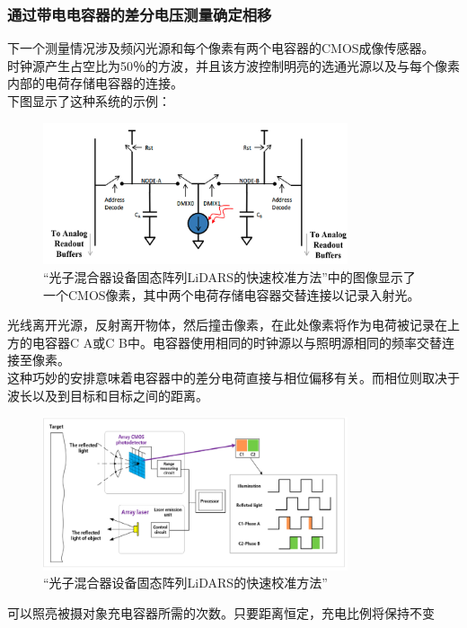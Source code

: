 \documentclass[UTF8]{ctexart}
\begin{document}
\subsubsection{通过带电电容器的差分电压测量确定相移}
下一个测量情况涉及频闪光源和每个像素有两个电容器的CMOS成像传感器。\\
时钟源产生占空比为50％的方波，并且该方波控制明亮的选通光源以及与每个像素内部的电荷存储电容器的连接。\\
下图显示了这种系统的示例：
\begin{figure}
	\centering
	\includegraphics[width=0.8\textwidth]{电路.png}
	\caption{“光子混合器设备固态阵列LiDARS的快速校准方法”中的图像显示了一个CMOS像素，其中两个电荷存储电容器交替连接以记录入射光。}
\end{figure}
光线离开光源，反射离开物体，然后撞击像素，在此处像素将作为电荷被记录在上方的电容器C A或C B中。电容器使用相同的时钟源以与照明源相同的频率交替连接至像素。  \\
这种巧妙的安排意味着电容器中的差分电荷直接与相位偏移有关。而相位则取决于波长以及到目标和目标之间的距离。\\
\begin{figure}
	\centering
	\includegraphics[width=0.8\textwidth]{快速校准方法.png}
	\caption{“光子混合器设备固态阵列LiDARS的快速校准方法”}
\end{figure}
可以照亮被摄对象充电容器所需的次数。只要距离恒定，充电比例将保持不变\\
\end{document}
